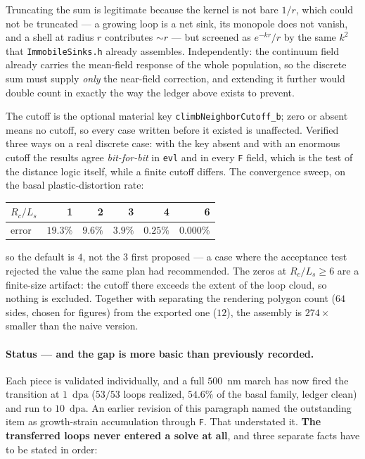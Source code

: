 \documentclass[11pt,a4paper]{article}
\newcommand{\code}[1]{\texttt{\small #1}}
\newcommand{\dpa}{\ensuremath{\mathrm{dpa}}}
\begin{document}
Truncating the sum is legitimate because the kernel is not bare $1/r$, which
could not be truncated --- a growing loop is a net sink, its monopole does not
vanish, and a shell at radius $r$ contributes $\sim r$ --- but screened as
$e^{-kr}/r$ by the same $k^2$ that \code{ImmobileSinks.h} already assembles.
Independently: the continuum field already carries the mean-field response of
the whole population, so the discrete sum must supply \emph{only} the near-field
correction, and extending it further would double count in exactly the way the
ledger above exists to prevent.

The cutoff is the optional material key \code{climbNeighborCutoff\_b}; zero or
absent means no cutoff, so every case written before it existed is unaffected.
Verified three ways on a real discrete case: with the key absent and with an
enormous cutoff the results agree \emph{bit-for-bit} in \code{evl} and in every
\code{F} field, which is the test of the distance logic itself, while a finite
cutoff differs. The convergence sweep, on the basal plastic-distortion rate:

\begin{center}
\begin{tabular}{lrrrrr}
\toprule
$R_c/L_s$ & 1 & 2 & 3 & 4 & 6 \\
\midrule
error & $19.3\%$ & $9.6\%$ & $3.9\%$ & $0.25\%$ & $0.000\%$ \\
\bottomrule
\end{tabular}
\end{center}

\noindent
so the default is $4$, not the $3$ first proposed --- a case where the
acceptance test rejected the value the same plan had recommended. The zeros at
$R_c/L_s \geq 6$ are a finite-size artifact: the cutoff there exceeds the extent
of the loop cloud, so nothing is excluded. Together with separating the
rendering polygon count ($64$ sides, chosen for figures) from the exported one
($12$), the assembly is $274\times$ smaller than the naive version.

\paragraph{Status --- and the gap is more basic than previously recorded.} Each
piece is validated individually, and a full $500$~nm march has now fired the
transition at $1$~\dpa{} ($53/53$ loops realized, $54.6\%$ of the basal family,
ledger clean) and run to $10$~\dpa. An earlier revision of this paragraph named
the outstanding item as growth-strain accumulation through \code{F}. That
understated it. \textbf{The transferred loops never entered a solve at all}, and
three separate facts have to be stated in order:
\end{document}
